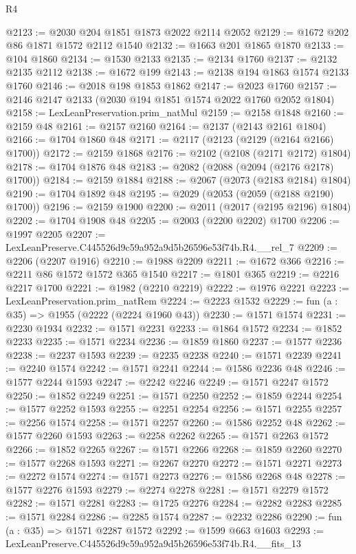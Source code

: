\begin{lexlean}{R4}
\begin{coremodule}
@2123 := @2030 @204 @1851 @1873 @2022 @2114 @2052
@2129 := @1672 @202 @86 @1871 @1572 @2112 @1540
@2132 := @1663 @201 @1865 @1870
@2133 := @104 @1860
@2134 := @1530 @2133
@2135 := @2134 @1760
@2137 := @2132 @2135 @2112
@2138 := @1672 @199
@2143 := @2138 @194 @1863 @1574 @2133 @1760
@2146 := @2018 @198 @1853 @1862
@2147 := @2023 @1760
@2157 := @2146 @2147 @2133 (@2030 @194 @1851 @1574 @2022 @1760 @2052 @1804)
@2158 := LexLeanPreservation.prim_natMul
@2159 := @2158 @1848
@2160 := @2159 @48
@2161 := @2157 @2160
@2164 := @2137 (@2143 @2161 @1804)
@2166 := @1704 @1860 @48
@2171 := @2117 (@2123 (@2129 (@2164 @2166) @1700))
@2172 := @2159 @1868
@2176 := @2102 (@2108 (@2171 @2172) @1804)
@2178 := @1704 @1876 @48
@2183 := @2082 (@2088 (@2094 (@2176 @2178) @1700))
@2184 := @2159 @1884
@2188 := @2067 (@2073 (@2183 @2184) @1804)
@2190 := @1704 @1892 @48
@2195 := @2029 (@2053 (@2059 (@2188 @2190) @1700))
@2196 := @2159 @1900
@2200 := @2011 (@2017 (@2195 @2196) @1804)
@2202 := @1704 @1908 @48
@2205 := @2003 (@2200 @2202) @1700
@2206 := @1997 @2205
@2207 := LexLeanPreserve.C445526d9c59a952a9d5b26596e53f74b.R4.__rel_7
@2209 := @2206 (@2207 @1916)
@2210 := @1988 @2209
@2211 := @1672 @366
@2216 := @2211 @86 @1572 @1572 @365 @1540
@2217 := @1801 @365
@2219 := @2216 @2217 @1700
@2221 := @1982 (@2210 @2219)
@2222 := @1976 @2221
@2223 := LexLeanPreservation.prim_natRem
@2224 := @2223 @1532
@2229 := fun (a : @35) => @1955 (@2222 (@2224 @1960 @43))
@2230 := @1571 @1574
@2231 := @2230 @1934
@2232 := @1571 @2231
@2233 := @1864 @1572
@2234 := @1852 @2233
@2235 := @1571 @2234
@2236 := @1859 @1860
@2237 := @1577 @2236
@2238 := @2237 @1593
@2239 := @2235 @2238
@2240 := @1571 @2239
@2241 := @2240 @1574
@2242 := @1571 @2241
@2244 := @1586 @2236 @48
@2246 := @1577 @2244 @1593
@2247 := @2242 @2246
@2249 := @1571 @2247 @1572
@2250 := @1852 @2249
@2251 := @1571 @2250
@2252 := @1859 @2244
@2254 := @1577 @2252 @1593
@2255 := @2251 @2254
@2256 := @1571 @2255
@2257 := @2256 @1574
@2258 := @1571 @2257
@2260 := @1586 @2252 @48
@2262 := @1577 @2260 @1593
@2263 := @2258 @2262
@2265 := @1571 @2263 @1572
@2266 := @1852 @2265
@2267 := @1571 @2266
@2268 := @1859 @2260
@2270 := @1577 @2268 @1593
@2271 := @2267 @2270
@2272 := @1571 @2271
@2273 := @2272 @1574
@2274 := @1571 @2273
@2276 := @1586 @2268 @48
@2278 := @1577 @2276 @1593
@2279 := @2274 @2278
@2281 := @1571 @2279 @1572
@2282 := @1571 @2281
@2283 := @1725 @2276
@2284 := @2282 @2283
@2285 := @1571 @2284
@2286 := @2285 @1574
@2287 := @2232 @2286
@2290 := fun (a : @35) => @1571 @2287 @1572
@2292 := @1599 @663 @1603
@2293 := LexLeanPreserve.C445526d9c59a952a9d5b26596e53f74b.R4.__fits_13

\end{coremodule}
\end{lexlean}
